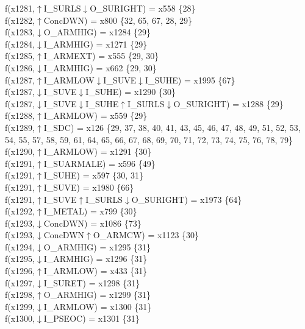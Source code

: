 f(x1281,$\uparrow$I\_SURLS$\downarrow$O\_SURIGHT) = x558 \{28\} \\  
f(x1282,$\uparrow$ConcDWN) = x800 \{32, 65, 67, 28, 29\} \\  
f(x1283,$\downarrow$O\_ARMHIG) = x1284 \{29\} \\  
f(x1284,$\downarrow$I\_ARMHIG) = x1271 \{29\} \\  
f(x1285,$\uparrow$I\_ARMEXT) = x555 \{29, 30\} \\  
f(x1286,$\downarrow$I\_ARMHIG) = x662 \{29, 30\} \\  
f(x1287,$\uparrow$I\_ARMLOW$\downarrow$I\_SUVE$\downarrow$I\_SUHE) = x1995 \{67\} \\  
f(x1287,$\downarrow$I\_SUVE$\downarrow$I\_SUHE) = x1290 \{30\} \\  
f(x1287,$\downarrow$I\_SUVE$\downarrow$I\_SUHE$\uparrow$I\_SURLS$\downarrow$O\_SURIGHT) = x1288 \{29\} \\  
f(x1288,$\uparrow$I\_ARMLOW) = x559 \{29\} \\  
f(x1289,$\uparrow$I\_SDC) = x126 \{29, 37, 38, 40, 41, 43, 45, 46, 47, 48, 49, 51, 52, 53, 54, 55, 57, 58, 59, 61, 64, 65, 66, 67, 68, 69, 70, 71, 72, 73, 74, 75, 76, 78, 79\} \\  
f(x1290,$\uparrow$I\_ARMLOW) = x1291 \{30\} \\  
f(x1291,$\uparrow$I\_SUARMALE) = x596 \{49\} \\  
f(x1291,$\uparrow$I\_SUHE) = x597 \{30, 31\} \\  
f(x1291,$\uparrow$I\_SUVE) = x1980 \{66\} \\  
f(x1291,$\uparrow$I\_SUVE$\uparrow$I\_SURLS$\downarrow$O\_SURIGHT) = x1973 \{64\} \\  
f(x1292,$\uparrow$I\_METAL) = x799 \{30\} \\  
f(x1293,$\downarrow$ConcDWN) = x1086 \{73\} \\  
f(x1293,$\downarrow$ConcDWN$\uparrow$O\_ARMCW) = x1123 \{30\} \\  
f(x1294,$\downarrow$O\_ARMHIG) = x1295 \{31\} \\  
f(x1295,$\downarrow$I\_ARMHIG) = x1296 \{31\} \\  
f(x1296,$\uparrow$I\_ARMLOW) = x433 \{31\} \\  
f(x1297,$\downarrow$I\_SURET) = x1298 \{31\} \\  
f(x1298,$\uparrow$O\_ARMHIG) = x1299 \{31\} \\  
f(x1299,$\downarrow$I\_ARMLOW) = x1300 \{31\} \\  
f(x1300,$\downarrow$I\_PSEOC) = x1301 \{31\} \\  
